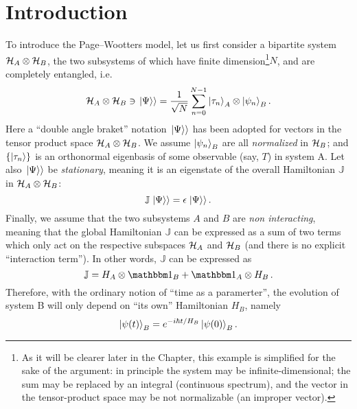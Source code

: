 \section{Introduction}

To introduce the Page--Wootters model, let us first consider
a bipartite system $\mathcal{H}_A \otimes \mathcal{H}_B$,
the two subsystems of which have finite dimension\footnote{
  As it will be clearer later in the Chapter,
  this example is simplified for the sake of the argument: in principle
  the system may be infinite-dimensional;
  the sum may be replaced by an integral (continuous spectrum),
  and the vector in the tensor-product space may be not normalizable (an improper vector).
}$N$,
and are completely
entangled, i.e.
\begin{equation}\label{eq:pw:finite-entanglement}
  \mathcal{H}_A \otimes \mathcal{H}_B \ni \left.\left| \Psi \right\rangle\right\rangle
  =
  \frac{1}{\sqrt{N}} \sum_{n=0}^{N-1} \ket{\tau_{n}}_{A} \otimes \ket{\psi_{n}}_{B} \text{.}
\end{equation}
Here
a ``double angle braket'' notation $\left.\left| \Psi \right\rangle\right\rangle$ has been adopted
for vectors in the tensor product space $\mathcal{H}_A \otimes \mathcal{H}_B$.
We assume $\ket{\psi_{n}}_{B}$ are all \emph{normalized} in $\mathcal{H}_B$;
and
$\qty{\ket{{\tau}_n}}$ is an orthonormal eigenbasis of some observable (say, $T$) in system A.
Let also $\left.\left| \Psi \right\rangle\right\rangle$ be \emph{stationary}, meaning it is an eigenstate
of the overall Hamiltonian $\mathbb{J}$ in $\mathcal{H}_A \otimes \mathcal{H}_B$:
$$
  \mathbb{J} \left.\left| \Psi \right\rangle\right\rangle = \epsilon \left.\left| \Psi \right\rangle\right\rangle \text{.}
$$
Finally, we assume that the two subsystems $A$ and $B$ are \emph{non interacting},
meaning that the global Hamiltonian $\mathbb{J}$ can be expressed as a sum of two terms
which only act on the respective subspaces $\mathcal{H}_A$ and $\mathcal{H}_B$
(and there is no explicit ``interaction term''). In other words,
$\mathbb{J}$ can be expressed as
$$
  \mathbb{J} = H_A \ox \idop_B + \idop_A \ox H_B \, \text{.} 
$$
Therefore, with the ordinary notion of ``time as a paramerter'',
the evolution of system B will only depend on ``its own'' Hamiltonian $H_B$, namely
\begin{equation}\label{eq:pw:ordinary_B}
  \ket{\psi(t)}_B = e^{- i \hbar t / H_B } \ket{\psi(0)}_B \text{.}  
\end{equation}
 
